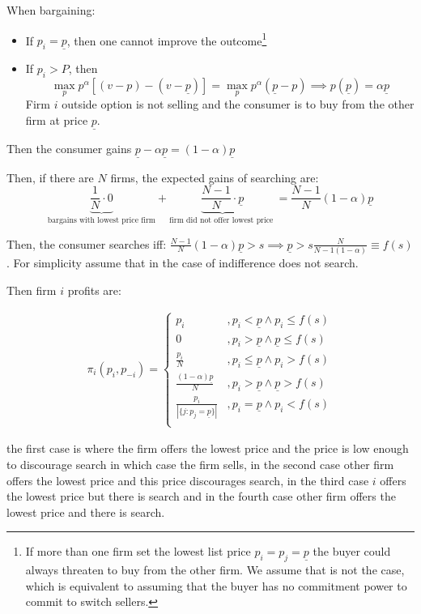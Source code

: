 \documentclass[12pt]{article}
\theoremstyle{plain}
\theoremstyle{plain}
\begin{document}
When bargaining:
\begin{itemize}
    \item If $p_i = \underline{p}$, then one cannot improve the outcome\footnote{If more than one firm set the lowest list price $p_i = p_j = \underline{p}$ the buyer could always threaten to buy from the other firm. We assume that is not the case, which is equivalent to assuming that the buyer has no commitment power to commit to switch sellers.  }
    \item If $p_i > P$, then
    \[
    \max_{p} p^\alpha [(v - p) - (v - \underline{p} )] = \max_{p} p^\alpha (\underline{p}  - p) \implies p(\underline{p} ) = \alpha \underline{p} 
    \]
    Firm $i$ outside option is not selling and the consumer is to buy from the other firm at price $\underline{p} $.
\end{itemize}

Then the consumer gains $\underline{p} - \alpha \underline{p}  = (1-\alpha) \underline{p} $


Then, if there are $N$ firms, the expected gains of searching are:
\[
\underbrace{\frac{1}{N} \cdot 0}_{\text{bargains with lowest price firm}} + \underbrace{\frac{N - 1}{N} \cdot \underline{p}}_{\text{firm did not offer lowest price }} = \frac{N - 1}{N}(1 - \alpha)\underline{p}
\]

Then, the consumer searches iff: $\frac{N - 1}{N}(1 - \alpha)\underline{p}> s \implies \underline{p}> s \frac{N}{N-1(1-\alpha)}\equiv f(s)$. For  simplicity assume that in the case of indifference does not search. 

Then firm $i$ profits are: 

\begin{align}
    \pi_i(p_i, p_{-i}) = 
    \begin{cases}
        p_i &, p_i < \underline{p} \land p_i \leq f(s) \\
        0 &, p_i > \underline{p} \land \underline{p} \leq f(s) \\
        \frac{p_i}{N} &, p_i \leq \underline{p} \land p_i > f(s)\\
        \frac{(1-\alpha)\underline{p}}{N} &, p_i > \underline{p} \land \underline{p} > f(s) \\
        \frac{p_i}{|\{j: p_j =\underline{p}\}|} &, p_i = \underline{p} \land p_i < f(s)\\      
    \end{cases}
\end{align}

the first case is where the  firm offers the lowest price and the price is low enough to discourage search in which case the firm sells, in the second case other firm offers the lowest price and this price discourages search, in the third 
case $i$ offers the lowest price but there is search and in the fourth case other firm offers the lowest price and there is search. 
\end{document}
